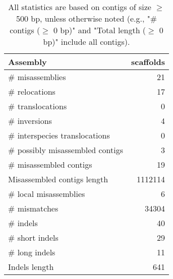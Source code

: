 \documentclass[12pt,a4paper]{article}
\begin{document}
\begin{table}[ht]
\begin{center}
\caption{All statistics are based on contigs of size $\geq$ 500 bp, unless otherwise noted (e.g., "\# contigs ($\geq$ 0 bp)" and "Total length ($\geq$ 0 bp)" include all contigs).}
\begin{tabular}{|l*{1}{|r}|}
\hline
Assembly & scaffolds \\ \hline
\# misassemblies & 21 \\ \hline
\hspace{5mm}\# relocations & 17 \\ \hline
\hspace{5mm}\# translocations & 0 \\ \hline
\hspace{5mm}\# inversions & 4 \\ \hline
\hspace{5mm}\# interspecies translocations & 0 \\ \hline
\# possibly misassembled contigs & 3 \\ \hline
\# misassembled contigs & 19 \\ \hline
Misassembled contigs length & 1112114 \\ \hline
\# local misassemblies & 6 \\ \hline
\# mismatches & 34304 \\ \hline
\# indels & 40 \\ \hline
\hspace{5mm}\# short indels & 29 \\ \hline
\hspace{5mm}\# long indels & 11 \\ \hline
Indels length & 641 \\ \hline
\end{tabular}
\end{center}
\end{table}
\end{document}
